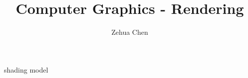 \documentclass[letterpaper, 11pt]{report}
\title{Computer Graphics - Rendering}
\author{Zehua Chen}
\begin{document}
  \maketitle
  \tableofcontents

  {shading}
  {model}
\end{document}
